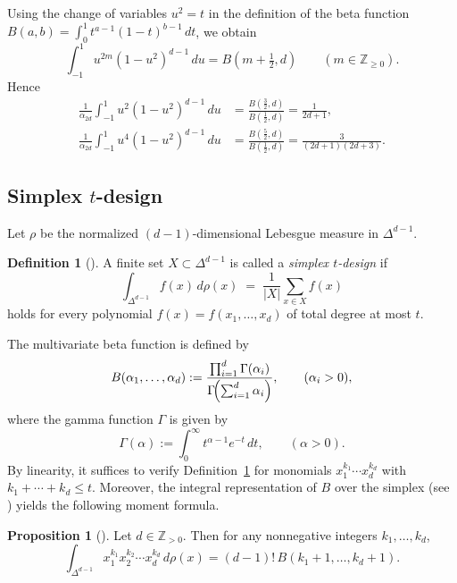 \documentclass{amsart}
\theoremstyle{definition}
\newtheorem{proposition}[theorem]{Proposition}
\newtheorem{definition}[theorem]{Definition}
\theoremstyle{remark}
\numberwithin{equation}{section}
\newcommand{\Z}{{\mathbb Z}}
\begin{document}
Using the change of variables $u^2=t$ in the definition of the beta function $B(a,b)=\int_0^1 t^{a-1}(1-t)^{b-1}\,dt$, we obtain
\[
\int_{-1}^1 u^{2m}(1-u^2)^{d-1}\,du
=
B\!\left(m+\tfrac12,d\right)
\qquad(m\in\mathbb Z_{\ge0}).
\]
Hence
\begin{align}
\frac{1}{\alpha_{2d}}\int_{-1}^1 u^{2}(1-u^2)^{d-1}\,du
&=\frac{B(\tfrac32,d)}{B(\tfrac12,d)}
=\frac{1}{2d+1},
\label{eq:interval-moment2}\\
\frac{1}{\alpha_{2d}}\int_{-1}^1 u^{4}(1-u^2)^{d-1}\,du
&=\frac{B(\tfrac52,d)}{B(\tfrac12,d)}
=\frac{3}{(2d+1)(2d+3)}.
\label{eq:interval-moment4}
\end{align}


\subsection{Simplex $t$-design}

Let $\rho$ be the normalized $(d-1)$-dimensional Lebesgue measure in $\Delta^{d-1}$.
\begin{definition}[{\cite[Eq.~(1.1)]{Baladram2018}}]\label{def:simplex_t_design}
A finite set $X\subset\Delta^{d-1}$ is called a \emph{simplex $t$-design} if
\[
\int_{\Delta^{d-1}} f(x)\,d\rho(x)
\;=\;
\frac{1}{|X|}\sum_{x\in X} f(x)
\]
holds for every polynomial $f(x)=f(x_1,\dots,x_d)$ of total degree at most $t$.
\end{definition}
The multivariate beta function is defined by
\[
B(\alpha_1,\dots,\alpha_d)
:=\frac{\prod_{i=1}^d \Gamma(\alpha_i)}{\Gamma\!\Bigl(\sum_{i=1}^d \alpha_i\Bigr)},
\qquad (\alpha_i>0),
\]
where the gamma function $\Gamma$ is given by
\[
\Gamma(\alpha):=\int_{0}^{\infty} t^{\alpha-1}e^{-t}\,dt,
\qquad (\alpha>0).
\]
By linearity, it suffices to verify Definition~\ref{def:simplex_t_design} for monomials
$x_1^{k_1}\cdots x_d^{k_d}$ with $k_1+\cdots+k_d\le t$.
Moreover, the integral representation of $B$ over the simplex
(see \cite[Eq.~(2.2)]{Baladram2018}) yields the following moment formula.

\begin{proposition}[{\cite[Eq.~(2.2) \& Eq.~(2.3)]{Baladram2018}}]
\label{prop:simplex-moment}
Let $d\in\Z_{>0}$.
Then for any nonnegative integers $k_1,\dots,k_d$,
\[
\int_{\Delta^{d-1}} x_1^{k_1}x_2^{k_2}\cdots x_d^{k_d}\,d\rho(x)
=
(d-1)!\,B(k_1+1,\dots,k_d+1).
\]
\end{proposition}
\end{document}
